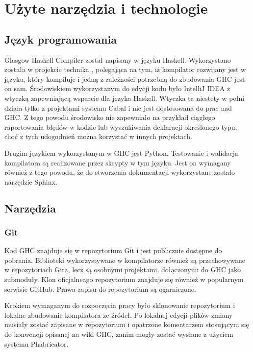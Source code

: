 \chapter{Użyte narzędzia i technologie}\label{chap:technologie}

\section{Język programowania}\label{sec:jezyk_programowania}

Glasgow Haskell Compiler został napisany w języku Haskell. Wykorzystano została w projekcie technika , polegająca na tym, iż kompilator rozwijany jest w języku, który kompiluje i jedną z zależności potrzebną do zbudowania GHC jest on sam. Środowiskiem wykorzystanym do edycji kodu było IntelliJ IDEA z wtyczką zapewniającą wsparcie dla języka Haskell. Wtyczka ta niestety w pełni działa tylko z projektami systemu Cabal i nie jest dostosowana do prac nad GHC. Z tego powodu środowisko nie zapewniało na przykład ciągłego raportowania błędów w kodzie lub wyszukiwania deklaracji określonego typu, choć z tych udogodnień można korzystać w innych projektach.

Drugim językiem wykorzystanym w GHC jest Python. Testowanie i walidacja kompilatora są realizowane przez skrypty w tym języku. Jest on wymagany również z tego powodu, że do stworzenia dokumentacji wykorzystane zostało narzędzie Sphinx.

\section{Narzędzia}

\subsection{Git}

Kod GHC znajduje się w repozytorium Git i jest publicznie dostępne do pobrania. Biblioteki wykorzystywane w kompilatorze również są przechowywane w repozytoriach Gita, lecz są osobnymi projektami, dołączonymi do GHC jako submoduły. Klon oficjalneago repozytorium znajduje się również w popularnym serwisie GitHub. Prawa zapisu do repozytorium są ogarniczone\cite{WikiGettingTheSources}.

Krokiem wymaganym do rozpoczęcia pracy było sklonowanie repozytorium i lokalne zbudowanie kompilatora ze źródeł. Po lokalnej edycji plików zmiany musiały zostać zapisane w repozytorium i opatrzone komentarzem stosującym się do konwencji opisanej na wiki GHC, zanim mogły zostać wysłane z użyciem systemu Phabricator.

